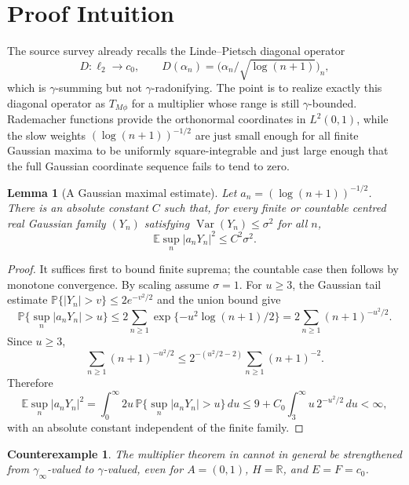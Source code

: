 \documentclass[11pt]{article}
\newtheorem*{theorem}{Counterexample}
\newtheorem*{lemma}{Lemma}
\newcommand{\R}{\mathbb R}
\newcommand{\E}{\mathbb E}
\newcommand{\Prob}{\mathbb P}
\begin{document}
\section*{Proof Intuition}

The source survey already recalls the Linde--Pietsch diagonal operator
\[
  D:\ell_2\to c_0,\qquad
  D(\alpha_n)=\big(\alpha_n/\sqrt{\log(n+1)}\big)_n,
\]
which is \(\gamma\)-summing but not \(\gamma\)-radonifying.  The point is to
realize exactly this diagonal operator as \(T_{M\phi}\) for a multiplier
whose range is still \(\gamma\)-bounded.  Rademacher functions provide the
orthonormal coordinates in \(L^2(0,1)\), while the slow weights
\((\log(n+1))^{-1/2}\) are just small enough for all finite Gaussian maxima
to be uniformly square-integrable and just large enough that the full
Gaussian coordinate sequence fails to tend to zero.

\begin{lemma}[A Gaussian maximal estimate]\label{lem:max}
Let \(a_n=(\log(n+1))^{-1/2}\).  There is an absolute constant \(C\) such
that, for every finite or countable centred real Gaussian family \((Y_n)\) satisfying
\(\operatorname{Var}(Y_n)\le \sigma^2\) for all \(n\),
\[
  \E\sup_n |a_nY_n|^2 \le C^2\sigma^2 .
\]
\end{lemma}

\begin{proof}
It suffices first to bound finite suprema; the countable case then follows
by monotone convergence.  By scaling assume \(\sigma=1\).  For \(u\ge 3\), the Gaussian tail estimate
\(\Prob\{|Y_n|>v\}\le 2e^{-v^2/2}\) and the union bound give
\[
  \Prob\{\sup_n |a_nY_n|>u\}
  \le
  2\sum_{n\ge1}\exp\{-u^2\log(n+1)/2\}
  =
  2\sum_{n\ge1}(n+1)^{-u^2/2}.
\]
Since \(u\ge3\),
\[
  \sum_{n\ge1}(n+1)^{-u^2/2}
  \le
  2^{-(u^2/2-2)}\sum_{n\ge1}(n+1)^{-2}.
\]
Therefore
\[
  \E\sup_n |a_nY_n|^2
  =
  \int_0^\infty 2u\,\Prob\{\sup_n |a_nY_n|>u\}\,du
  \le
  9+
  C_0\int_3^\infty u\,2^{-u^2/2}\,du
  <\infty,
\]
with an absolute constant independent of the finite family.
\end{proof}

\begin{theorem}
The multiplier theorem in \cite[Theorem 5.2]{vanNeerven2009} cannot in
general be strengthened from \(\gamma_\infty\)-valued to
\(\gamma\)-valued, even for \(A=(0,1)\), \(H=\R\), and \(E=F=c_0\).
\end{theorem}
\end{document}
